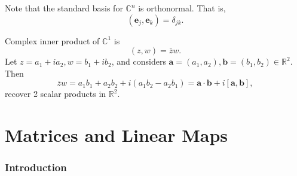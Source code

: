 \documentclass[10pt]{article}
\begin{document}
    Note that the standard basis for $ \mathbb{C}^{n} $ is orthonormal. That is,
    \[
        (\mathbf{e}_j,\mathbf{e}_k)=\delta_{jk}
    .\]
    \begin{example}
        Complex inner product of $ \mathbb{C}^{1} $ is 
        \[
            (z,w)=\bar{z}w 
        .\]
        Let $ z=a_1+ia_2,w=b_1+ib_2 $, and considers $ \mathbf{a}=(a_1,a_2),\mathbf{b}=(b_1,b_2)\in \mathbb{R}^{2} $. Then 
        \[
            \bar{z}w=a_1b_1+a_2b_2+i(a_1b_2-a_2b_1)=\mathbf{a}\cdot \mathbf{b}+i[\mathbf{a},\mathbf{b}]
        ,\]
        recover 2 scalar products in $ \mathbb{R}^2 $.
    \end{example}\newpage
    \part{Matrices and Linear Maps}
    \section{Introduction}
\end{document}
